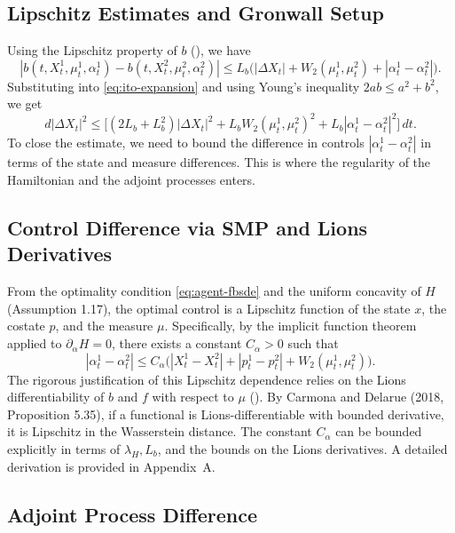 \subsection{Lipschitz Estimates and Gronwall Setup}

Using the Lipschitz property of $b$ (), we have
\[
    |b(t, X_t^1, \mu_t^1, \alpha_t^1) - b(t, X_t^2, \mu_t^2, \alpha_t^2)| \leq
    L_b\big(|\Delta X_t| + W_2(\mu_t^1, \mu_t^2) + |\alpha_t^1 - \alpha_t^2|\big).
\]
Substituting into \eqref{eq:ito-expansion} and using Young's inequality
$2ab \leq a^2 + b^2$, we get
\begin{equation}
    d|\Delta X_t|^2 \leq \big[(2L_b + L_b^2)|\Delta X_t|^2 + L_b W_2(\mu_t^1, \mu_t^2)^2
    + L_b |\alpha_t^1 - \alpha_t^2|^2\big]\, dt.
    \label{eq:gronwall-setup}
\end{equation}
To close the estimate, we need to bound the difference in controls
$|\alpha_t^1 - \alpha_t^2|$ in terms of the state and measure differences. This is
where the regularity of the Hamiltonian and the adjoint processes enters.

\subsection{Control Difference via SMP and Lions Derivatives}

From the optimality condition \eqref{eq:agent-fbsde} and the uniform concavity of $H$
(Assumption 1.17), the optimal control is a Lipschitz function of the state $x$, the
costate $p$, and the measure $\mu$. Specifically, by the implicit function theorem
applied to $\partial_\alpha H = 0$, there exists a constant $C_\alpha > 0$ such that
\begin{equation}
    |\alpha_t^1 - \alpha_t^2| \leq C_\alpha\big(|X_t^1 - X_t^2| + |p_t^1 - p_t^2| +
    W_2(\mu_t^1, \mu_t^2)\big).
    \label{eq:control-lipschitz}
\end{equation}
The rigorous justification of this Lipschitz dependence relies on the Lions
differentiability of $b$ and $f$ with respect to $\mu$ (). By
Carmona and Delarue (2018, Proposition 5.35), if a functional is Lions-differentiable
with bounded derivative, it is Lipschitz in the Wasserstein distance. The constant
$C_\alpha$ can be bounded explicitly in terms of $\lambda_H, L_b$, and the bounds on
the Lions derivatives. A detailed derivation is provided in Appendix~A.

\subsection{Adjoint Process Difference}

